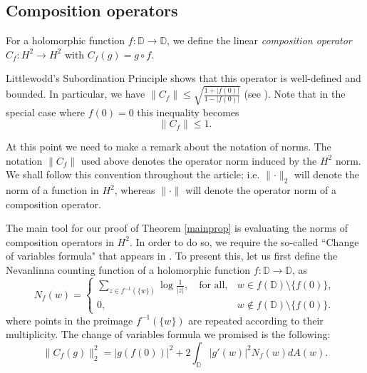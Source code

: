 \documentclass[11pt, reqno]{amsart}
\theoremstyle{definition}
\numberwithin{equation}{section}
\newcommand{\D}{\mathbb{D}}
\renewcommand{\leq}{\leqslant}
\begin{document}
\subsection{Composition operators}
For a holomorphic function $f\colon\D\to\D$, we define the linear \emph{composition operator} $C_f\colon H^2\to H^2$ with $C_f(g)=g\circ f$.

Littlewodd's Subordination Principle \cite[Theorem 1.7]{Du1970} shows that this operator is well-defined and bounded. In particular, we have $\lVert C_f \rVert \leq \sqrt{\frac{1+\lvert f(0) \rvert}{1-\lvert f(0) \rvert}}$ (see \cite[p. 16]{Sh1993}). Note that in the special case where $f(0)=0$ this inequality becomes 
\begin{equation}\label{eq: littlewood norm}
\lVert C_f \rVert \leq 1.
\end{equation}

At this point we need to make a remark about the notation of norms. The notation $\lVert C_f \rVert$ used above denotes the operator norm induced by the $H^2$ norm. We shall follow this convention throughout the article; i.e. $\lVert \cdot \rVert_2$ will denote the norm of a function in $H^2$, whereas $\lVert \cdot \rVert$ will denote the operator norm of a composition operator.

The main tool for our proof of Theorem \ref{mainprop} is evaluating the norms of composition operators in $H^2$. In order to do so, we require the so-called ``Change of variables formula" that appears in \cite[p. 179]{Sh1993}. To present this, let us first define the Nevanlinna counting function of a holomorphic function $f\colon\D\to\D$, as 
\[
N_f(w)=\begin{cases}\displaystyle \sum_{z\in f^{-1}(\{w\})}\log \frac{1}{\lvert z \rvert}, \quad \text{for all}, & w\in f(\D)\setminus\{f(0)\},\\
					0, &w\notin f(\D)\setminus\{f(0)\}. \end{cases}
\]
where points in the preimage $f^{-1}(\{w\})$ are repeated according to their multiplicity. The change of variables formula we promised is the following:
\begin{equation}\label{change_var}
\lVert C_f(g) \rVert_2^2 = \lvert g(f(0)) \rvert^2 + 2 \int_{\D}\lvert g'(w)\rvert^2 N_f(w) dA(w).
\end{equation}
\end{document}
